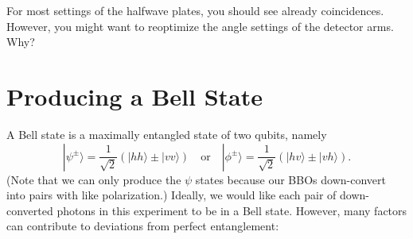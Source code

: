 \documentclass{../lab}
\begin{document}
For most settings of the halfwave plates, you should see already coincidences. However, you might want to reoptimize the angle settings of the detector arms. Why?


\section{Producing a Bell State}

A Bell state is a maximally entangled state of two qubits, namely
\begin{equation}
    |\psi^\pm\rangle = \frac{1}{\sqrt{2}}(|hh\rangle \pm |vv\rangle)
    \quad \text{or} \quad
    |\phi^\pm\rangle = \frac{1}{\sqrt{2}}(|hv\rangle \pm |vh\rangle).
\end{equation}
(Note that we can only produce the $\psi$ states because our BBOs down-convert into pairs with like polarization.) Ideally, we would like each pair of down-converted photons in this experiment to be in a Bell state. However, many factors can contribute to deviations from perfect entanglement:
\end{document}
